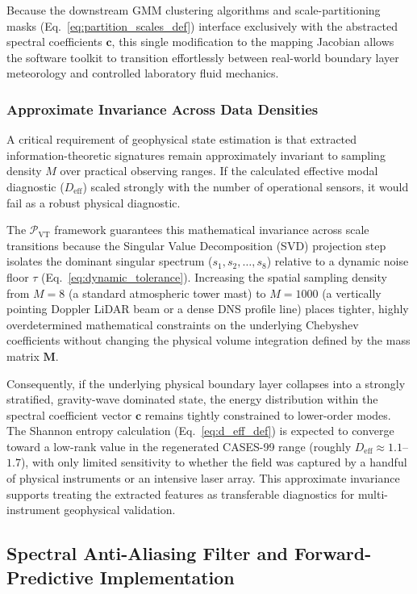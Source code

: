 Because the downstream GMM clustering algorithms and scale-partitioning masks (Eq.~\ref{eq:partition_scales_def}) interface exclusively with the abstracted spectral coefficients $\mathbf{c}$, this single modification to the mapping Jacobian allows the software toolkit to transition effortlessly between real-world boundary layer meteorology and controlled laboratory fluid mechanics.

\subsubsection{Approximate Invariance Across Data Densities}
\label{sec:extensions:invariance}

A critical requirement of geophysical state estimation is that extracted information-theoretic signatures remain approximately invariant to sampling density $M$ over practical observing ranges. If the calculated effective modal diagnostic ($D_{\mathrm{eff}}$) scaled strongly with the number of operational sensors, it would fail as a robust physical diagnostic.

The $\mathcal{P}_{\mathrm{VT}}$ framework guarantees this mathematical invariance across scale transitions because the Singular Value Decomposition (SVD) projection step isolates the dominant singular spectrum ($s_1, s_2, \dots, s_8$) relative to a dynamic noise floor $\tau$ (Eq.~\ref{eq:dynamic_tolerance}). Increasing the spatial sampling density from $M = 8$ (a standard atmospheric tower mast) to $M = 1000$ (a vertically pointing Doppler LiDAR beam or a dense DNS profile line) places tighter, highly overdetermined mathematical constraints on the underlying Chebyshev coefficients without changing the physical volume integration defined by the mass matrix $\mathbf{M}$.

Consequently, if the underlying physical boundary layer collapses into a strongly stratified, gravity-wave dominated state, the energy distribution within the spectral coefficient vector $\mathbf{c}$ remains tightly constrained to lower-order modes. The Shannon entropy calculation (Eq.~\ref{eq:d_eff_def}) is expected to converge toward a low-rank value in the regenerated CASES-99 range (roughly $D_{\mathrm{eff}} \approx 1.1$--$1.7$), with only limited sensitivity to whether the field was captured by a handful of physical instruments or an intensive laser array. This approximate invariance supports treating the extracted features as transferable diagnostics for multi-instrument geophysical validation.

\subsection{Spectral Anti-Aliasing Filter and Forward-Predictive Implementation}
\label{sec:extensions:antialiasing}

